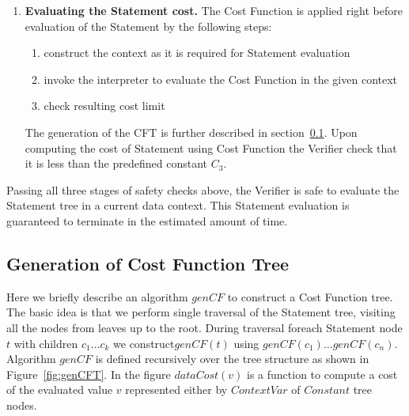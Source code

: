 \documentclass[11pt]{article}
\begin{document}
{\begin{enumerate}
 The idea is that the complexity of obtaining the Cost Function ($genCF$) is
 linear in the size of the Statement tree. Execution time of the Cost Function
 is linear in the size of the input data of the Statement which is strictly
 limited in size.

\item \textbf{Evaluating the Statement cost.}
The Cost Function is applied right before evaluation of the Statement by the
following steps:
    \begin{enumerate}
        \item construct the context as it is required for Statement evaluation
        \item invoke the interpreter to evaluate the Cost Function in the
        given context
        \item check resulting cost limit
    \end{enumerate}

The generation of the CFT is further described in
section~\ref{sec:gen-cost-function}. Upon computing the cost of Statement
using Cost Function the Verifier check that it is less than the predefined
constant $C_3$.
\end{enumerate}

Passing all three stages of safety checks above, the Verifier is safe to
evaluate the Statement tree in a current data context. This Statement
evaluation is guaranteed to terminate in the estimated amount of time.

\subsection{Generation of Cost Function Tree}
\label{sec:gen-cost-function}

Here we briefly describe an algorithm $genCF$ to construct a Cost Function
tree. The basic idea is that we perform single traversal of the Statement
tree, visiting all the nodes from leaves up to the root. During traversal
foreach Statement node $t$ with children ${c_1 \dots c_k}$ we
construct$genCF(t)$ using ${genCF(c_1) \dots genCF(c_n)}$. Algorithm $genCF$
is defined recursively over the tree structure as shown in
Figure~\ref{fig:genCFT}. In the figure $dataCost(v)$ is a function to compute
a cost of the evaluated value $v$ represented either by $ContextVar$ of
$Constant$ tree nodes.

}
\end{document}
